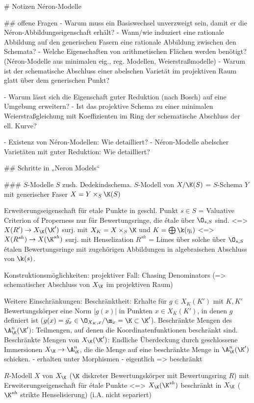 # Notizen Néron-Modelle

## offene Fragen
- Warum muss ein Basiswechsel unverzweigt sein, damit er die
  Néron-Abbildungseigenschaft erhält?
- Wann/wie induziert eine rationale Abbildung auf den generischen
  Fasern eine rationale Abbildung zwischen den Schemata?
- Welche Eigenschaften von arithmetischen Flächen werden benötigt?
  (Néron-Modelle aus minimalen eig., reg. Modellen,
  Weierstraßmodelle)
- Warum ist der schematische Abschluss einer abelschen Varietät im
  projektiven Raum glatt über dem generischen Punkt?

- Warum lässt sich die Eigenschaft guter Reduktion (nach Bosch) auf
  eine Umgebung erweitern?
- Ist das projektive Schema zu einer minimalen Weierstraßgleichung mit
  Koeffizienten im Ring der schematische Abschluss der ell. Kurve?

- Existenz von Néron-Modellen: Wie detailliert?
- Néron-Modelle abelscher Varietäten mit guter Reduktion: Wie detailliert?
  

## Schritte in „Neron Models“

### $S$-Modelle 
$S$ zush. Dedekindschema.
$S$-Modell von $X/\K(S)$ = $S$-Schema $Y$ mit generischer Faser $X=Y \times_S \K(S)$

Erweiterungseigenschaft für etale Punkte in geschl. Punkt $s\in S$
= Valuative Criterion of Properness nur für Bewertungsringe, die étale
über $\O_{s,S}$ sind.
<=> $X(R') \to X_\K(\K')$ surj.
    mit $X_K=X \times_S \K$ und $K=\bigoplus \k(\eta_i)$
<=> $X(R^{sh}) \to X(\K^{sh})$ surj.
    mit Henselization $R^{sh}$ = Limes über solche über $\O_{s,S}$ étalen
    Bewertungsringe mit zugehörigen Abbildungen in algebraischen Abschluss
    von $\k(s)$.

Konstruktionsmöglichkeiten:
projektiver Fall: Chasing Denominators (=> schematischer Abschluss von
$X_\K$ im projektiven Raum)

Weitere Einschränkungen:
Beschränktheit: Erhalte für $g\in X_K(K')$ mit $K,K'$ Bewertungskörper
eine Norm $|g(x)|$ in Punkten $x\in X_K(K')$, in denen $g$ definiert
ist ($g(x)=\bar{g_x}\in \O_{X_K,x}/\m_x=\K\subset\K' $).
Beschränkte Mengen des $\A_\K^n(\K')$: Teilmengen, auf denen die
Koordinatenfunktionen beschränkt sind.
Beschränkte Mengen von $X_\K(\K')$: Endliche Überdeckung durch
geschlossene Immersionen $X_\K\to\A_\K^n$, die die Menge auf eine
beschränkte Menge in $\A_\K^n(\K')$ schicken.
- erhalten unter Morphismen
- eigentlich => beschränkt

$R$-Modell $X$ von $X_\K$ ($\K$ diskreter Bewertungskörper mit
Bewertungsring $R$) mit Erweiterungseigenschaft für étale Punkte
<=> $X_\K(\K^{sh})$ beschränkt in $X_\K$ ($\K^{sh}$ strikte
Henselisierung)
(i.A. nicht separiert)
